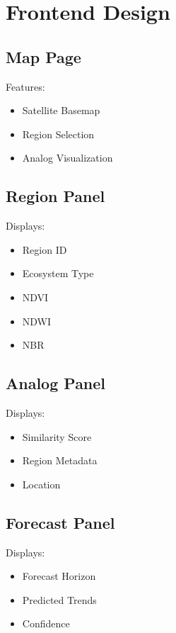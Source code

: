 \documentclass[11pt,a4paper]{article}
\begin{document}
\section{Frontend Design}

\subsection{Map Page}

Features:

\begin{itemize}
\item Satellite Basemap
\item Region Selection
\item Analog Visualization
\end{itemize}

\subsection{Region Panel}

Displays:

\begin{itemize}
\item Region ID
\item Ecosystem Type
\item NDVI
\item NDWI
\item NBR
\end{itemize}

\subsection{Analog Panel}

Displays:

\begin{itemize}
\item Similarity Score
\item Region Metadata
\item Location
\end{itemize}

\subsection{Forecast Panel}

Displays:

\begin{itemize}
\item Forecast Horizon
\item Predicted Trends
\item Confidence
\end{itemize}
\end{document}
